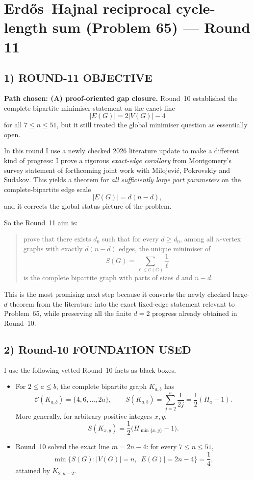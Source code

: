 \section{Erd\H{o}s--Hajnal reciprocal cycle-length sum (Problem 65) --- Round 11}

\subsection*{1) ROUND-11 OBJECTIVE}

\textbf{Path chosen: (A) proof-oriented gap closure.}
Round~10 established the complete-bipartite minimiser statement on the exact line
\[
|E(G)|=2|V(G)|-4
\]
for all $7\le n\le 51$, but it still treated the global minimiser question as essentially open.

In this round I use a newly checked 2026 literature update to make a different kind of progress: I prove a rigorous \emph{exact-edge corollary} from Montgomery's survey statement of forthcoming joint work with Milojevi\'c, Pokrovskiy and Sudakov. This yields a theorem for \emph{all sufficiently large part parameters} on the complete-bipartite edge scale
\[
|E(G)|=d(n-d),
\]
and it corrects the global status picture of the problem.

So the Round~11 aim is:
\begin{quote}
prove that there exists $d_0$ such that for every $d\ge d_0$, among all $n$-vertex graphs with exactly $d(n-d)$ edges, the unique minimiser of
\[
S(G)=\sum_{\ell\in \mathcal C(G)}\frac1\ell
\]
is the complete bipartite graph with parts of sizes $d$ and $n-d$.
\end{quote}

This is the most promising next step because it converts the newly checked large-$d$ theorem from the literature into the exact fixed-edge statement relevant to Problem~65, while preserving all the finite $d=2$ progress already obtained in Round~10.

\subsection*{2) Round-10 FOUNDATION USED}

I use the following vetted Round~10 facts as black boxes.

\begin{itemize}
\item[(F1)] For $2\le a\le b$, the complete bipartite graph $K_{a,b}$ has
\[
\mathcal C(K_{a,b})=\{4,6,\dots,2a\},
\qquad
S(K_{a,b})=\sum_{j=2}^{a}\frac1{2j}=\frac12(H_a-1).
\]
More generally, for arbitrary positive integers $x,y$,
\[
S(K_{x,y})=\frac12\bigl(H_{\min\{x,y\}}-1\bigr).
\]

\item[(F2)] Round~10 solved the exact line $m=2n-4$: for every $7\le n\le 51$,
\[
\min\{S(G): |V(G)|=n,\ |E(G)|=2n-4\}=\frac14,
\]
attained by $K_{2,n-2}$.
\end{itemize}

